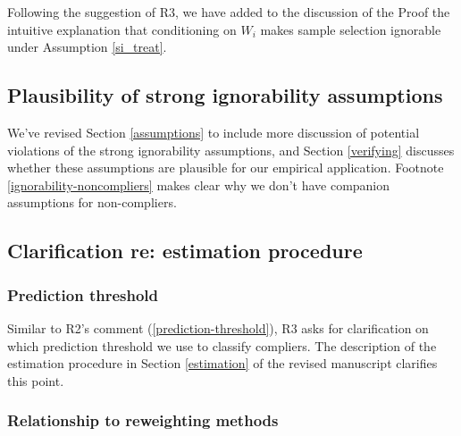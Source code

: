 \documentclass[hidelinks,12pt,letterpaper]{article}
\begin{document}

Following the suggestion of R3, we have added to the discussion of the Proof the intuitive explanation that conditioning on $W_i$ makes sample selection ignorable under Assumption \ref{si_treat}. 

\subsection{Plausibility of strong ignorability assumptions}

We've revised Section \ref{assumptions} to include more discussion of potential violations of the strong ignorability assumptions, and Section \ref{verifying} discusses whether these assumptions are plausible for our empirical application. Footnote \ref{ignorability-noncompliers} makes clear why we don’t have companion assumptions for non-compliers.

\subsection{Clarification re: estimation procedure}

\subsubsection{Prediction threshold}

Similar to R2's comment (\ref{prediction-threshold}), R3 asks for clarification on which prediction threshold we use to classify compliers. The description of the estimation procedure in Section \ref{estimation} of the revised manuscript clarifies this point. 

\subsubsection{Relationship to reweighting methods}
\end{document}
